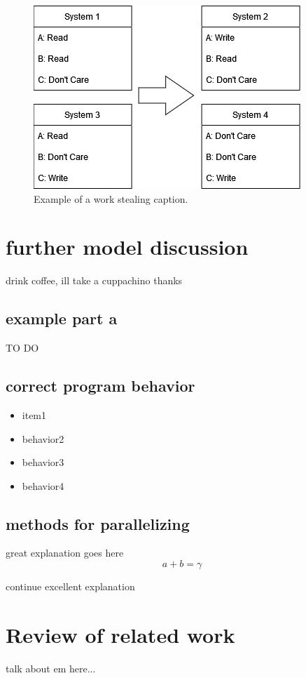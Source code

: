 \documentclass[conference]{IEEEtran}
\begin{document}
\begin{figure}[htbp]
\centerline{\includegraphics[scale=.4]{work_stealing.png}}
\caption{Example of a work stealing caption.}
\label{label for work stealing}
\end{figure}

\section{further model discussion}
drink coffee, ill take a cuppachino thanks

\subsection{example part a}
TO DO
\subsection{correct program behavior}
\begin{itemize}
\item item1
\item behavior2
\item behavior3
\item behavior4
\end{itemize}

\subsection{methods for parallelizing}
great explanation goes here
\begin{equation}
a+b=\gamma\label{eq}
\end{equation}

continue excellent explanation 

\section{Review of related work}
talk about em here...
\end{document}
